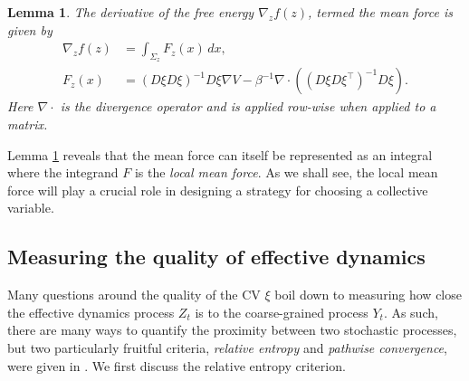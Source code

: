 \documentclass[reqno, 12pt]{article}
\newtheorem{lemma}{Lemma}
\newtheorem{proposition}{Proposition}
\begin{document}
\begin{lemma}
\label{lem: mean force lemma}
    The derivative of the free energy $\nabla_z f(z)$, termed the \emph{mean force} is given by
    \begin{align}
        \nabla_z f(z) &= \int_{\Sigma_z} F_z(x)\,dx, \\
        F_z(x) &= (D\xi D\xi)^{-1}D\xi \nabla V - \beta^{-1}\nabla \cdot ((D\xi D\xi^{\top})^{-1} D\xi). \label{eq: local mean force} 
    \end{align}
    Here $\nabla \cdot$ is the divergence operator and is applied row-wise when applied to a matrix. 
\end{lemma}

Lemma \ref{lem: mean force lemma} reveals that the mean force can itself be represented as an integral where the integrand $F$ is the \emph{local mean force}. As we shall see, the local mean force will play a crucial role in designing a strategy for choosing a collective variable. 



\subsection{Measuring the quality of effective dynamics}

Many questions around the quality of the CV $\xi$ boil down to measuring how close the effective dynamics process $Z_t$ is to the coarse-grained process $Y_t$. As such, there are many ways to quantify the proximity between two stochastic processes, but two particularly fruitful criteria, \emph{relative entropy} and \emph{pathwise convergence}, were given in \parencite{legoll2010effective, duong2018quantification, lelievre2019pathwise}. We first discuss the relative entropy criterion.
\end{document}
